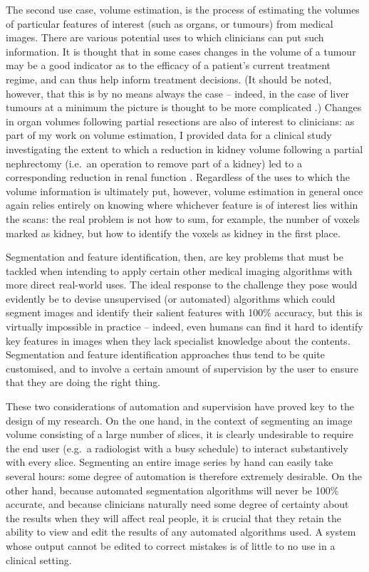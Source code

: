 The second use case, volume estimation, is the process of estimating the volumes of particular features of interest (such as organs, or tumours) from medical images. There are various potential uses to which clinicians can put such information. It is thought \cite{?} that in some cases changes in the volume of a tumour may be a good indicator as to the efficacy of a patient's current treatment regime, and can thus help inform treatment decisions. (It should be noted, however, that this is by no means always the case -- indeed, in the case of liver tumours at a minimum the picture is thought to be more complicated \cite{kelly07}.) Changes in organ volumes following partial resections are also of interest to clinicians: as part of my work on volume estimation, I provided data for a clinical study investigating the extent to which a reduction in kidney volume following a partial nephrectomy (i.e.~an operation to remove part of a kidney) led to a corresponding reduction in renal function \cite{pbgmvc09}. Regardless of the uses to which the volume information is ultimately put, however, volume estimation in general once again relies entirely on knowing where whichever feature is of interest lies within the scans: the real problem is not how to sum, for example, the number of voxels marked as kidney, but how to identify the voxels as kidney in the first place.

Segmentation and feature identification, then, are key problems that must be tackled when intending to apply certain other medical imaging algorithms with more direct real-world uses. The ideal response to the challenge they pose would evidently be to devise unsupervised (or automated) algorithms which could segment images and identify their salient features with 100\% accuracy, but this is virtually impossible in practice -- indeed, even humans can find it hard to identify key features in images when they lack specialist knowledge about the contents. Segmentation and feature identification approaches thus tend to be quite customised, and to involve a certain amount of supervision by the user to ensure that they are doing the right thing.

These two considerations of automation and supervision have proved key to the design of my research. On the one hand, in the context of segmenting an image volume consisting of a large number of slices, it is clearly undesirable to require the end user (e.g.~a radiologist with a busy schedule) to interact substantively with every slice. Segmenting an entire image series by hand can easily take several hours: some degree of automation is therefore extremely desirable. On the other hand, because automated segmentation algorithms will never be 100\% accurate, and because clinicians naturally need some degree of certainty about the results when they will affect real people, it is crucial that they retain the ability to view and edit the results of any automated algorithms used. A system whose output cannot be edited to correct mistakes is of little to no use in a clinical setting.

